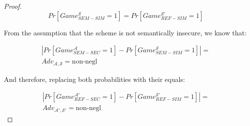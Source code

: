 \begin{proof}
    \begin{equation}
        Pr[Game_{SEM-SIM}^{\mathcal{S}} = 1] = Pr[Game_{REF-SIM}^{\mathcal{S'}} = 1]
    \end{equation}

    From the assumption that the scheme is not semantically insecure, we know
    that:

    \begin{align*}
        |Pr[Game_{SEM-SEC}^{\mathcal{A}} = 1] - Pr[Game_{SEM-SIM}^{\mathcal{S}} = 1]| =\\
        Adv_{\mathcal{A}, \mathcal{S}} = \text{non-negl}
    \end{align*}

    And therefore, replacing both probabilities with their equals:

    \begin{align*}
        |Pr[Game_{REF-SEC}^{\mathcal{A'}} = 1] -
        Pr[Game_{REF-SIM}^{\mathcal{S'}} = 1]| =\\
        Adv_{\mathcal{A'}, \mathcal{S'}} = \text{non-negl}
    \end{align*}
\end{proof}

\begin{lemma}
\end{lemma}

